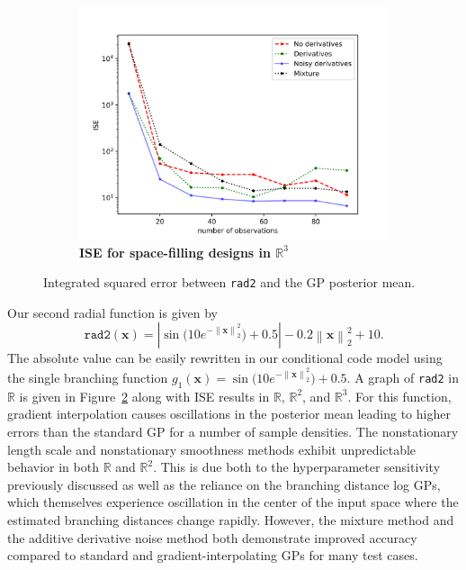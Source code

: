 \documentclass{article}
\newcommand{\norm}[1]{\left\lVert#1\right\rVert}
\newcommand{\abs}[1]{\left|#1\right|}
\renewcommand{\vec}[1]{\mathbf{#1}}
\newcommand{\R}{\mathbb{R}}
\numberwithin{equation}{section}
\begin{document}
\begin{figure}
\begin{subfigure}[t]{.4\textwidth}
      \includegraphics[scale=0.35]{figures/crazy-3D-LH.png}
      \caption{\textbf{ISE for space-filling designs in $\R^3$}}
      \label{LH}
    \end{subfigure}
		\caption{Integrated squared error between \texttt{rad2} and the GP posterior mean.}
		\label{crazy}
\end{figure}

Our second radial function is given by
$$\texttt{rad2}(\vec{x}) = \abs{\sin\Big(10e^{-\norm{\vec{x}}_2^2}\Big) + 0.5} - 0.2\norm{\vec{x}}_2^2 + 10.$$
The absolute value can be easily rewritten in our conditional code model using the single branching function $g_1(\vec{x}) = \sin\Big(10e^{-\norm{\vec{x}}_2^2}\Big) + 0.5$. A graph of \texttt{rad2} in $\R$ is given in Figure~\ref{crazy} along with ISE results in $\R$, $\R^2$, and $\R^3$. For this function, gradient interpolation causes oscillations in the posterior mean leading to higher errors than the standard GP for a number of sample densities. The nonstationary length scale and nonstationary smoothness methods exhibit unpredictable behavior in both $\R$ and $\R^2$. This is due both to the hyperparameter sensitivity previously discussed as well as the reliance on the branching distance log GPs, which themselves experience oscillation in the center of the input space where the estimated branching distances change rapidly. However, the mixture method and the additive derivative noise method both demonstrate improved accuracy compared to standard and gradient-interpolating GPs for many test cases.
\end{document}
